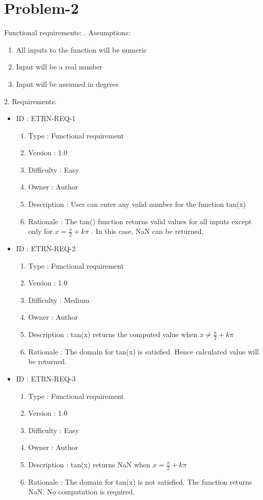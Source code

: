 \documentclass[12pt]{article}
\begin{document}
\section{Problem-2}
Functional requirements:
. Assumptions:
\begin{enumerate}
    \item All inputs to the function will be numeric
    \item Input will be a real number
    \item Input will be assumed in degrees 
\end{enumerate}
2. Requirements:
\newline
\begin{itemize}
\item ID : ETRN-REQ-1
    \begin{enumerate}
        \item Type : Functional requirement 
		\item Version : 1.0
		\item Difficulty : Easy
		\item Owner : Author
		\item Description : User can enter any valid number for the function tan(x)
        \item Rationale : The tan() function returns valid values for all inputs except only for $ x = \frac{\pi}{2} + k\pi $ . In this case, NaN can be returned.   
    \end{enumerate}
\item ID : ETRN-REQ-2
    \begin{enumerate}
        \item Type : Functional requirement 
		\item Version : 1.0
		\item Difficulty : Medium
		\item Owner : Author
		\item Description : tan(x) returns the computed value when $ x \neq \frac{\pi}{2} + k\pi$
        \item Rationale : The domain for tan(x) is satisfied. Hence calculated value will be returned.
    \end{enumerate}
    \newpage
\item ID : ETRN-REQ-3
    \begin{enumerate}
        \item Type : Functional requirement 
		\item Version : 1.0
		\item Difficulty : Easy
		\item Owner : Author
		\item Description : tan(x) returns NaN when $ x = \frac{\pi}{2} + k\pi$
        \item Rationale : The domain for tan(x) is not satisfied. The function returns NaN. No computation is required.


\end{enumerate}
\end{itemize}
\end{document}
